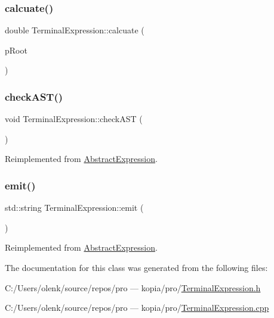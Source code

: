 \subsubsection{\texorpdfstring{calcuate()}{calcuate()}}
{\footnotesize\ttfamily double Terminal\+Expression\+::calcuate (\begin{DoxyParamCaption}\item[{std\+::unique\+\_\+ptr$<$ \mbox{\hyperlink{class_abstract_expression}{Abstract\+Expression}} $>$ \&}]{p\+Root }\end{DoxyParamCaption})}

\mbox{\label{class_terminal_expression_acc524881ef522ae0cf1231f2cae2b060}} 
\subsubsection{\texorpdfstring{checkAST()}{checkAST()}}
{\footnotesize\ttfamily void Terminal\+Expression\+::check\+A\+ST (\begin{DoxyParamCaption}{ }\end{DoxyParamCaption})\hspace{0.3cm}{\ttfamily [virtual]}}



Reimplemented from \mbox{\hyperlink{class_abstract_expression_a703563fdf65d18ce4b7f2817e2ff4581}{Abstract\+Expression}}.

\mbox{\label{class_terminal_expression_ab18820d8216ab5c2d6111c374aa22423}} 
\subsubsection{\texorpdfstring{emit()}{emit()}}
{\footnotesize\ttfamily std\+::string Terminal\+Expression\+::emit (\begin{DoxyParamCaption}{ }\end{DoxyParamCaption})\hspace{0.3cm}{\ttfamily [virtual]}}



Reimplemented from \mbox{\hyperlink{class_abstract_expression_a9f19c05e663491688cdf4423e002a391}{Abstract\+Expression}}.



The documentation for this class was generated from the following files\+:\begin{DoxyCompactItemize}
\item 
C\+:/\+Users/olenk/source/repos/pro — kopia/pro/\mbox{\hyperlink{_terminal_expression_8h}{Terminal\+Expression.\+h}}\item 
C\+:/\+Users/olenk/source/repos/pro — kopia/pro/\mbox{\hyperlink{_terminal_expression_8cpp}{Terminal\+Expression.\+cpp}}\end{DoxyCompactItemize}
